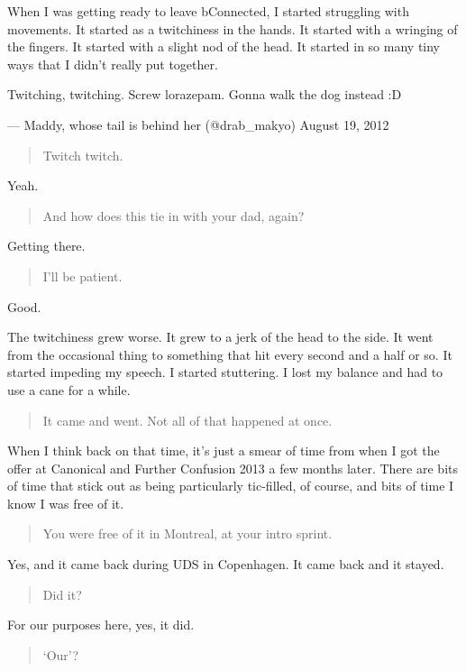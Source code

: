 When I was getting ready to leave bConnected, I started struggling with movements. It started as a twitchiness in the hands. It started with a wringing of the fingers. It started with a slight nod of the head. It started in so many tiny ways that I didn't really put together.

Twitching, twitching. Screw lorazepam. Gonna walk the dog instead :D

--- Maddy, whose tail is behind her (@drab\_makyo) August 19, 2012

\begin{quote}
Twitch twitch.
\end{quote}

Yeah.

\begin{quote}
And how does this tie in with your dad, again?
\end{quote}

Getting there.

\begin{quote}
I'll be patient.
\end{quote}

Good.

The twitchiness grew worse. It grew to a jerk of the head to the side. It went from the occasional thing to something that hit every second and a half or so. It started impeding my speech. I started stuttering. I lost my balance and had to use a cane for a while.

\begin{quote}
It came and went. Not all of that happened at once.
\end{quote}

When I think back on that time, it's just a smear of time from when I got the offer at Canonical and Further Confusion 2013 a few months later. There are bits of time that stick out as being particularly tic-filled, of course, and bits of time I know I was free of it.

\begin{quote}
You were free of it in Montreal, at your intro sprint.
\end{quote}

Yes, and it came back during UDS in Copenhagen. It came back and it stayed.

\begin{quote}
Did it?
\end{quote}

For our purposes here, yes, it did.

\begin{quote}
`Our'?
\end{quote}

